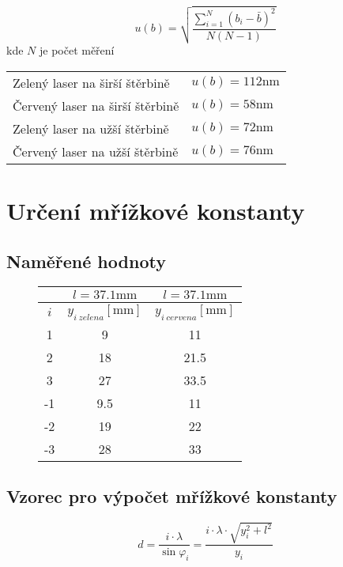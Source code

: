 \documentclass[a4paper,10pt]{article}
\begin{document}
\begin{equation}
 u(b) = \sqrt{\frac{\sum_{i=1}^N(b_i-\bar{b})^2}{N(N-1)}}
\end{equation}
kde $N$ je počet měření

\begin{tabular}{l l}
 Zelený laser na širší štěrbině & $ u(b) = 112 \si{\nano\meter}$\\
 Červený laser na širší štěrbině & $ u(b) = 58 \si{\nano\meter}$\\
 Zelený laser na užší štěrbině & $ u(b) = 72 \si{\nano\meter}$\\
 Červený laser na užší štěrbině & $ u(b) = 76 \si{\nano\meter}$
\end{tabular}

\section{Určení mřížkové konstanty}
\subsection{Naměřené hodnoty}

\begin{figure}[H]
	\centering
    \begin{tabular}{c||c|c}
        & $l=37.1 \si{\milli\meter}$ & $l=37.1 \si{\milli\meter}$\\ \hline
        $i$ & $y_{i\ zelena} [\si{\milli\meter}]$ & $y_{i\ cervena} [\si{\milli\meter}]$\\ \hline \hline
        1 & 9 & 11 \\ \hline
        2 & 18 & 21.5 \\ \hline
        3 & 27 & 33.5 \\ \hline
        -1 & 9.5 & 11 \\ \hline
        -2 & 19 & 22 \\ \hline
        -3 & 28 & 33
    \end{tabular}
\end{figure}

\subsection{Vzorec pro výpočet mřížkové konstanty}

\begin{equation}
 d = \frac{i \cdot \lambda}{\sin{\varphi_i}} = \frac{i \cdot \lambda \cdot \sqrt{y_i^2 + l^2}}{y_i}
\end{equation}
\end{document}
